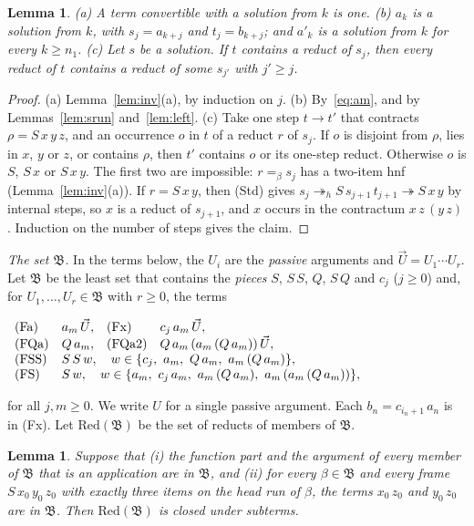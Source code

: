 \documentclass[11pt]{amsart}
\newtheorem{lemma}[theorem]{Lemma}
\theoremstyle{definition}
\newcommand{\red}{\twoheadrightarrow}
\newcommand{\hred}{\twoheadrightarrow_h}
\newcommand{\conv}{=_\beta}
\newcommand{\B}{\mathfrak B}
\newcommand{\Red}{\mathrm{Red}}
\newcommand{\vU}{\vec U}
\begin{document}
\begin{lemma}\label{lem:persist}
\textup{(a)} A term convertible with a solution from $k$ is one.
\textup{(b)} $a_k$ is a solution from $k$, with $s_j=a_{k+j}$ and $t_j=b_{k+j}$; and $a'_k$ is a
solution from $k$ for every $k\ge n_1$.
\textup{(c)} Let $s$ be a solution. If $t$ contains a reduct of $s_j$, then every reduct of $t$
contains a reduct of some $s_{j'}$ with $j'\ge j$.
\end{lemma}

\begin{proof}
(a) Lemma~\ref{lem:inv}(a), by induction on $j$. (b) By~\eqref{eq:am}, and by
Lemmas~\ref{lem:srun} and~\ref{lem:left}. (c) Take one step $t\to t'$ that contracts
$\rho=S\,x\,y\,z$, and an occurrence $o$ in $t$ of a reduct $r$ of $s_j$. If $o$ is disjoint from
$\rho$, lies in $x$, $y$ or $z$, or contains $\rho$, then $t'$ contains $o$ or its one-step reduct.
Otherwise $o$ is $S$, $S\,x$ or $S\,x\,y$. The first two are impossible: $r\conv s_j$ has a
two-item hnf (Lemma~\ref{lem:inv}(a)). If $r=S\,x\,y$, then (Std) gives
$s_j\hred S\,s_{j+1}\,t_{j+1}\red S\,x\,y$ by internal steps, so $x$ is a reduct of $s_{j+1}$, and
$x$ occurs in the contractum $x\,z\,(y\,z)$. Induction on the number of steps gives the claim.
\end{proof}

\emph{The set $\B$.} In the terms below, the $U_i$ are the \emph{passive} arguments and
$\vU=U_1\cdots U_r$. Let $\B$ be the least set that contains the \emph{pieces} $S$, $S\,S$, $Q$,
$S\,Q$ and $c_j$ ($j\ge0$) and, for $U_1,\dots,U_r\in\B$ with $r\ge0$, the terms
\begin{center}\small$
\begin{array}{llll}
(\mathrm{Fa})& a_m\,\vU, &(\mathrm{Fx})& c_j\,a_m\,\vU,\\
(\mathrm{FQa})& Q\,a_m, &(\mathrm{FQa2})& Q\,a_m\,(a_m\,(Q\,a_m))\,\vU,\\
(\mathrm{FSS})& \multicolumn{3}{l}{S\,S\,w,\quad w\in\{c_j,\ a_m,\ Q\,a_m,\ a_m\,(Q\,a_m)\},}\\
(\mathrm{FS})& \multicolumn{3}{l}{S\,w,\quad w\in\{a_m,\ c_j\,a_m,\ a_m\,(Q\,a_m),\ a_m\,(a_m\,(Q\,a_m))\},}
\end{array}$
\end{center}
for all $j,m\ge0$. We write $U$ for a single passive argument. Each $b_n=c_{i_n+1}\,a_n$ is in
(Fx). Let $\Red(\B)$ be the set of reducts of members of $\B$.

\begin{lemma}\label{lem:closure}
Suppose that \textup{(i)} the function part and the argument of every member of $\B$ that is an
application are in $\B$, and \textup{(ii)} for every $\beta\in\B$ and every frame
$S\,x_0\,y_0\,z_0$ with exactly three items on the head run of $\beta$, the terms $x_0\,z_0$ and
$y_0\,z_0$ are in $\B$. Then $\Red(\B)$ is closed under subterms.
\end{lemma}
\end{document}
